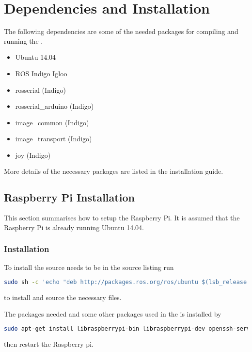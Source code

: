 \chapter{Dependencies and Installation}\label{app:dependencies}
The following dependencies are some of the needed packages for compiling and running the \abbrROV.
\begin{itemize}
    \item Ubuntu 14.04
    \item ROS Indigo Igloo
    \item rosserial (Indigo)
    \item rosserial\_arduino (Indigo)
    \item image\_common (Indigo) 
    \item image\_transport (Indigo)
    \item joy (Indigo)
\end{itemize}

More details of the necessary packages are listed in the installation guide.

\section{Raspberry Pi Installation}
This section summarises how to setup the Raspberry Pi. It is assumed that the Raspberry Pi is already running Ubuntu 14.04.

\subsection{\abbrROS Installation}
To install \abbrROS the \abbrROS source needs to be in the source listing run

\begin{lstlisting}[language=bash]
sudo sh -c 'echo "deb http://packages.ros.org/ros/ubuntu $(lsb_release -sc) main" > /etc/apt/sources.list.d/ros-latest.list' && sudo apt-get install ros-indigo-ros-base -y && sudo rosdep init && rosdep update && echo "source /opt/ros/indigo/setup.bash" >> ~/.bashrc && source ~/.bashrc && sudo apt-get upgrade -y && sudo ln -s /usr /opt/vc
\end{lstlisting}
to install \abbrROS and source the necessary files.

The packages needed and some other packages used in the \abbrROV is installed by
\begin{lstlisting}[language=bash]
sudo apt-get install libraspberrypi-bin libraspberrypi-dev openssh-server build-essential avahi-daemon linux-firmware python-rosinstall ros-indigo-rosserial ros-indigo-rosserial-arduino ros-indigo-image-common ros-indigo-image-transport-plugins git && sudo sh -c 'echo "start_x=1\ngpu_mem=128" >> /boot/config.txt'
\end{lstlisting}
then restart the Raspberry pi.

